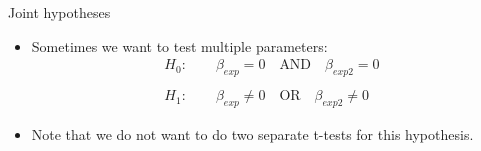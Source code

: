 \begin{frame}{Joint hypotheses}
\begin{itemize}
	\item Sometimes we want to test multiple parameters:\[
\begin{array}{c}
H_{0}:\qquad\beta_{exp}=0\quad\text{AND}\quad\beta_{exp2}=0\\
\\
H_{1}:\qquad\beta_{exp}\ne0\quad\text{OR}\quad\beta_{exp2}\ne0
\end{array}
\]

	\item Note that we do not want to do two separate t-tests for this hypothesis. 
\end{itemize}
\end{frame}



